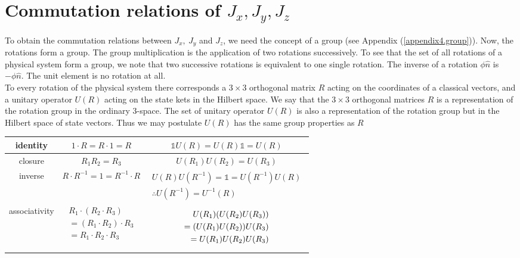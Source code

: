\section{Commutation relations of $J_x,J_y,J_z$}

To obtain the commutation relations between $J_x,\ J_y$ and $J_z$, we need the concept of a group (see Appendix (\ref{appendix4.group})). Now, the rotations form a group. The group multiplication is the application of two rotations successively. To see that the set of all rotations of a physical system form a group, we note that two successive rotations is equivalent to one single rotation. The inverse of a rotation $\phi \hat{n}$ is $-\phi\hat{n}$. The unit element is no rotation at all.\\


To every rotation of the physical system there corresponds a $3\times 3$ orthogonal matrix $R$ acting on the coordinates of a classical vectors, and a unitary operator $U(R)$ acting on the state kets in the Hilbert space. We say that the $3\times 3$ orthogonal matrices $R$ is a representation of the rotation group in the ordinary $3$-space. The set of unitary operator $U(R)$ is also a representation of the rotation group but in the Hilbert space of state vectors. Thus we may postulate $U(R)$ has the same group properties as $R$
\begin{table}
	\begin{tabular}{c|c|c}
		identity & $1\cdot R = R\cdot 1 = R$ & $\mathbb{1} U(R) = U(R) \mathbb{1} = U(R)$ \\ \hline
		closure & $R_1 R_2 = R_3$ & $U(R_1) U(R_2) = U(R_3)$ \\ \hline
		inverse & $R \cdot R^{-1} = 1 = R^{-1}\cdot R$ & 
			\begin{minipage}{5cm}
				\begin{align*}
				U(R) U(R^{-1}) = \mathbb{1} =  U(R^{-1})  U(R)\\
				\therefore  U(R^{-1}) =  U^{-1}(R) 
				\end{align*}
			\end{minipage}\\ \hline
		associativity & 
		\begin{minipage}{5cm}
			\begin{align*}
			R_1 \cdot (R_2 \cdot R_3) \\
			= (R_1 \cdot R_2) \cdot R_3 \\
			= R_1 \cdot R_2 \cdot R_3
			\end{align*}
		\end{minipage}
			 & 
		\begin{minipage}{5cm}
			\begin{align*}
			U(R_1)\qty(U(R_2) U(R_3)) \\
			= \qty(U(R_1)U(R_2)) U(R_3)\\
			= U(R_1)U(R_2) U(R_3)
			\end{align*}
		\end{minipage}
	\end{tabular}
\end{table}

